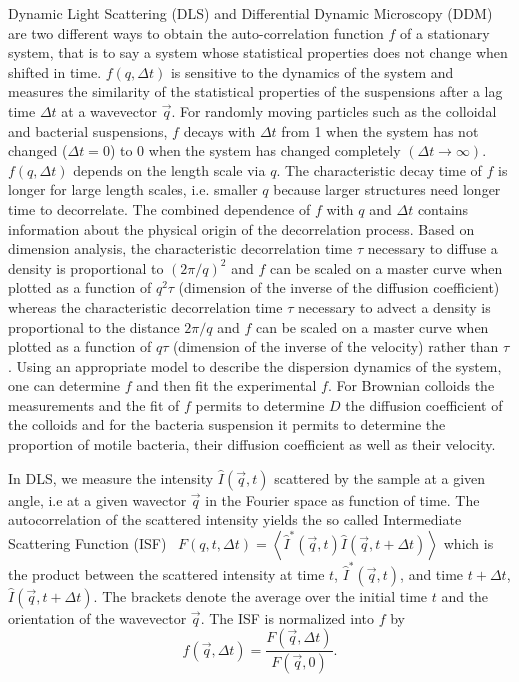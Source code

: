 \documentclass[%
 aip,
 jmp,%
 amsmath,amssymb,
reprint,%
]{revtex4-1}
\newcommand{\tg}[1]{{\color{magenta}#1}} %
\begin{document}
Dynamic Light Scattering (DLS) and Differential Dynamic Microscopy (DDM) are two different ways to obtain the auto-correlation function \tg{$f$}\cite{ajp1995passmore} of a stationary system, that is to say a system whose statistical properties does not change when shifted in time. \tg{$f(q, \Delta t)$ is sensitive to the dynamics of the system and measures the similarity of the statistical properties of the suspensions after a lag time $\Delta t$ at a wavevector $\vec{q}$. For randomly moving particles such as the colloidal and bacterial suspensions, $f$ decays with $\Delta t$ from 1 when the system has not changed ($\Delta t=0$) to 0 when the system has changed completely $(\Delta t\rightarrow\infty)$. $f(q, \Delta t)$ depends on the length scale via  $q$. The characteristic decay time of $f$ is longer for large length scales, i.e. smaller $q$ because larger structures need longer time to decorrelate. The combined dependence of $f$ with $q$ and $\Delta t$ contains information about the physical origin of the decorrelation process. Based on dimension analysis, the characteristic decorrelation time $\tau$ necessary to diffuse a density is proportional to $(2\pi/q)^2$ and $f$ can be scaled on a master curve when plotted as a function of $q^2\tau$ (dimension of the inverse of the diffusion coefficient) whereas the characteristic decorrelation time $\tau$ necessary to advect a density is proportional to the distance $2\pi/q$ and $f$ can be scaled on a master curve when plotted as a function of $q\tau$ (dimension of the inverse of the velocity) rather than $\tau$. Using an appropriate model to describe the dispersion dynamics of the system, one can determine $f$ and then fit the experimental $f$. For Brownian colloids the measurements and the fit of $f$ permits to determine $D$ the diffusion coefficient of the colloids and for the bacteria suspension it permits to determine the proportion of motile bacteria, their diffusion coefficient as well as their velocity.}

In DLS, we measure the intensity $\hat{I}(\vec{q}, t)$ scattered by the sample at a given angle, i.e at a given wavector $\vec{q}$ in the Fourier space as function of time. The autocorrelation of the scattered intensity yields the so called Intermediate Scattering Function (ISF)~\cite{19_goodman2005introduction} $F(q, t, \Delta t) = \left\langle \hat{I}^*(\vec{q}, t) \hat{I}(\vec{q}, t+\Delta t) \right\rangle$ \tg{which is the product between the scattered intensity at time $t$,  $\hat{I}^*(\vec{q}, t)$, and time $t+\Delta t$, $\hat{I}(\vec{q}, t+\Delta t)$.} The brackets denote the average over the initial time $t$ and the orientation of the wavevector $\vec{q}$. The ISF is normalized into $f$ by
\begin{equation}
f(\vec{q}, \Delta t) = \frac{F(\vec{q}, \Delta t)}{F(\vec{q}, 0)}.
\end{equation}
\end{document}
